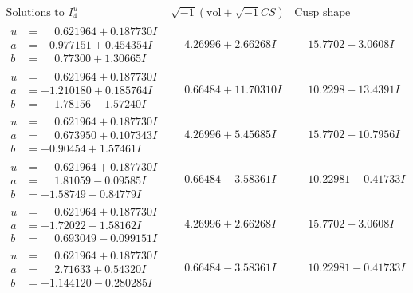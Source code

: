 \documentclass[1p]{elsarticle_modified}
\theoremstyle{definition}
\newcommand{\I}{\sqrt{-1}}
\begin{document}
$$\begin{array}{c|c|c}  
\text{Solutions to }I^u_{4}& \I (\text{vol} + \sqrt{-1}CS) & \text{Cusp shape}\\
 \hline 
\begin{aligned}
u &= \phantom{-}0.621964 + 0.187730 I \\
a &= -0.977151 + 0.454354 I \\
b &= \phantom{-}0.77300 + 1.30665 I\end{aligned}
 & \phantom{-}4.26996 + 2.66268 I & \phantom{-}15.7702 - 3.0608 I \\ \hline\begin{aligned}
u &= \phantom{-}0.621964 + 0.187730 I \\
a &= -1.210180 + 0.185764 I \\
b &= \phantom{-}1.78156 - 1.57240 I\end{aligned}
 & \phantom{-}0.66484 + 11.70310 I & \phantom{-}10.2298 - 13.4391 I \\ \hline\begin{aligned}
u &= \phantom{-}0.621964 + 0.187730 I \\
a &= \phantom{-}0.673950 + 0.107343 I \\
b &= -0.90454 + 1.57461 I\end{aligned}
 & \phantom{-}4.26996 + 5.45685 I & \phantom{-}15.7702 - 10.7956 I \\ \hline\begin{aligned}
u &= \phantom{-}0.621964 + 0.187730 I \\
a &= \phantom{-}1.81059 - 0.09585 I \\
b &= -1.58749 - 0.84779 I\end{aligned}
 & \phantom{-}0.66484 - 3.58361 I & \phantom{-}10.22981 - 0.41733 I \\ \hline\begin{aligned}
u &= \phantom{-}0.621964 + 0.187730 I \\
a &= -1.72022 - 1.58162 I \\
b &= \phantom{-}0.693049 - 0.099151 I\end{aligned}
 & \phantom{-}4.26996 + 2.66268 I & \phantom{-}15.7702 - 3.0608 I \\ \hline\begin{aligned}
u &= \phantom{-}0.621964 + 0.187730 I \\
a &= \phantom{-}2.71633 + 0.54320 I \\
b &= -1.144120 - 0.280285 I\end{aligned}
 & \phantom{-}0.66484 - 3.58361 I & \phantom{-}10.22981 - 0.41733 I \\ \hline\begin{aligned}

\end{aligned}
\end{array}$$
\end{document}
